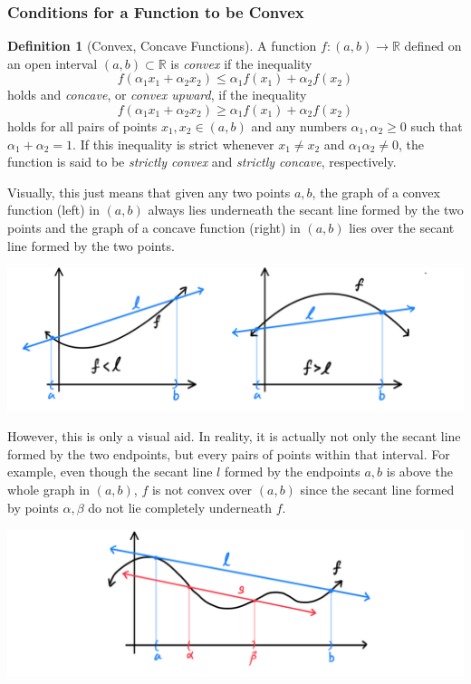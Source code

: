 \documentclass{article}
\theoremstyle{remark}
\theoremstyle{definition}
\newtheorem{definition}{Definition}[section]
\begin{document}
\subsubsection{Conditions for a Function to be Convex}
\begin{definition}[Convex, Concave Functions]
A function $f: (a, b) \longrightarrow \mathbb{R}$ defined on an open interval $(a, b) \subset \mathbb{R}$ is \textit{convex} if the inequality
\[f( \alpha_1 x_1 + \alpha_2 x_2) \leq \alpha_1 f(x_1) + \alpha_2 f(x_2)\]
holds and \textit{concave}, or \textit{convex upward}, if the inequality 
\[f( \alpha_1 x_1 + \alpha_2 x_2) \geq \alpha_1 f(x_1) + \alpha_2 f(x_2)\]
holds for all pairs of points $x_1, x_2 \in (a, b)$ and any numbers $\alpha_1, \alpha_2 \geq 0$ such that $\alpha_1 + \alpha_2 = 1$. If this inequality is strict whenever $x_1 \neq x_2$ and $\alpha_1 \alpha_2 \neq 0$, the function is said to be \textit{strictly convex} and \textit{strictly concave}, respectively. 

Visually, this just means that given any two points $a, b$, the graph of a convex function (left) in $(a, b)$ always lies underneath the secant line formed by the two points and the graph of a concave function (right) in $(a, b)$ lies over the secant line formed by the two points. 
\begin{center}
    \includegraphics[scale=0.3]{img/Convex_Concave_Functions_Secant.PNG}
\end{center}
However, this is only a visual aid. In reality, it is actually not only the secant line formed by the two endpoints, but every pairs of points within that interval. For example, even though the secant line $l$ formed by the endpoints $a, b$ is above the whole graph in $(a, b)$, $f$ is not convex over $(a, b)$ since the secant line formed by points $\alpha, \beta$ do not lie completely underneath $f$. 
\begin{center}
    \includegraphics[scale=0.3]{img/Multiple_Secant_Lines_Convex_Clarification.PNG}
\end{center}
\end{definition}
\end{document}
